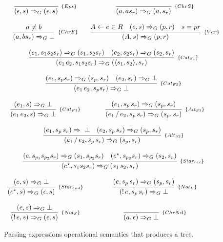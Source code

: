 \begin{figure}[H]
   \[
      \begin{array}{cc}
         \infer[_{\{Eps\}}]{(\epsilon,s) \Rightarrow_G (\epsilon,s)}{} &
         \infer[_{\{ChrS\}}]{(a,as_r) \Rightarrow_G (a,s_r)}{} \\ \\
         \infer[_{\{ChrF\}}]{(a,bs_r) \Rightarrow_G \bot}{a \neq b} &
         \infer[_{\{Var\}}]{(A,s) \Rightarrow_G (p, r)}
                        {A \leftarrow e \in R & (e,s) \Rightarrow_G (p,r) & s = pr} \\ \\
         \multicolumn{2}{c}{
            \infer[_{\{Cat_{S1}\}}]{(e_1\,e_2,s_1s_2s_r) \Rightarrow_G (\langle s_1,s_2 \rangle, s_r)}
                                 {(e_1,s_1s_2s_r) \Rightarrow_G (s_1,s_2s_r) &
                                 (e_2,s_2s_r)\Rightarrow_G (s_2,s_r)}
         } \\ \\
         \multicolumn{2}{c}{
            \infer[_{\{Cat_{F2}\}}]{(e_1\,e_2,s_ps_r) \Rightarrow_G \bot}
                                 { (e_1,s_ps_r) \Rightarrow_G (s_p,s_r) &
                                    (e_2,s_r) \Rightarrow_G \bot}} \\ \\
         \infer[_{\{Cat_{F1}\}}]{(e_1\,e_2,s)\Rightarrow_G \bot}{(e_1,s) \Rightarrow_G \bot} &
         \infer[_{\{Alt_{S1}\}}]{(e_1\,/\,e_2,s_p\,s_r) \Rightarrow_G (s_p,s_r)}
                                {(e_1,s_p\,s_r)\Rightarrow_G (s_p,s_r)} \\ \\
         \multicolumn{2}{c}{
           \infer[_{\{Alt_{S2}\}}]{(e_1\,/\,e_2,s_p\,s_r) \Rightarrow_G (s_p, s_r)}
                                  {(e_1,s_p\,s_r)\Rightarrow\ \bot &
                                   (e_2,s_p\,s_r)\Rightarrow_G (s_p,s_r)}
         } \\ \\
         \multicolumn{2}{c}{
            \infer[_{\{Star_{rec}\}}]{(e^\star,s_1s_2s_r) \Rightarrow_G (s_1\,s_2,s_r)}
                                 {(e,s_{p_1}s_{p_2}s_r) \Rightarrow_G (s_1,s_{p_2}s_r) &
                                  (e^\star, s_{p_2}s_r) \Rightarrow_G (s_2,s_r)}
         } \\ \\
         \infer[_{\{Star_{end}\}}]{(e^\star,s) \Rightarrow_G (\epsilon,s)}
                                    {(e,s) \Rightarrow_G \bot} &
         \infer[_{\{Not_F\}}]{(!\,e,s_p\,s_r) \Rightarrow_G \bot}
                          {(e,s_p\,s_r) \Rightarrow_G (s_p,s_r)}\\ \\
         \infer[_{\{Not_S\}}]{(!\,e,s) \Rightarrow_G (\epsilon,s)}
         {(e,s) \Rightarrow_G \bot}
           &
         \infer[_{\{ChrNil\}}]{(a,\epsilon) \Rightarrow_G \bot}{}
      \end{array}
   \]
   \centering
   \caption{Parsing expressions operational semantics that produces a tree.}
   \label{fig:pegsemantics}
\end{figure}

